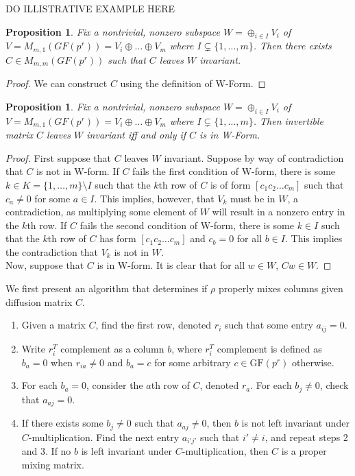 \documentclass[11pt]{amsart}
\newcommand{\GF}{\mathrm{GF}}
\newtheorem{proposition}[theorem]{{\bf Proposition}}
\begin{document}
DO ILLISTRATIVE EXAMPLE HERE

\begin{proposition}
Fix a nontrivial, nonzero subspace $W = \oplus_{i \in I} V_i$ of $V = M_{m,1}(GF(p^r))=V_i \oplus \dots \oplus V_m$ where $I \subsetneq \{1,\dots,m\}$. Then there exists $C \in M_{m,m}(GF(p^r))$ such that $C$ leaves $W$ invariant.
\end{proposition}
\begin{proof}
We can construct $C$ using the definition of W-Form.
\end{proof}

\begin{proposition}
Fix a nontrivial, nonzero subspace $W = \oplus_{i \in I} V_i$ of $V = M_{m,1}(GF(p^r))=V_i \oplus \dots \oplus V_m$ where $I \subsetneq \{1,\dots,m\}$. Then invertible matrix $C$ leaves $W$ invariant iff and only if $C$ is in W-Form.
\end{proposition}
\begin{proof}
First suppose that $C$ leaves $W$ invariant. Suppose by way of contradiction that $C$ is not in W-form. If $C$ fails the first condition of W-form, there is some $k \in K = \{1,\dots,m\} \setminus I$ such that the $k$th row of $C$ is of form $[c_1 c_2 \dots c_m]$ such that $c_a \neq 0$ for some $a \in I$. This implies, however, that $V_k$ must be in $W$, a contradiction, as multiplying some element of $W$ will result in a nonzero entry in the $k$th row. If $C$ fails the second condition of W-form, there is some $k \in I$ such that the $k$th row of $C$ has form $[c_1 c_2 \dots c_m]$ and $c_b = 0$ for all $b \in I$. This implies the contradiction that $V_k$ is not in $W$. \\

Now, suppose that $C$ is in W-form. It is clear that for all $w \in W$, $Cw \in W$.
\end{proof}

We first present an algorithm that determines if $\rho$ properly mixes columns given diffusion matrix $C$.

\begin{enumerate}
    \item Given a matrix $C$, find the first row, denoted $r_i$ such that some entry $a_{ij}=0$.
    \item Write $r_i^T$ complement as a column $b$, where $r_i^T$ complement is defined as $b_a=0$ when $r_{ia} \neq 0$ and $b_a = c$ for some arbitrary $c \in \GF(p^r)$ otherwise.
    \item For each $b_a = 0$, consider the $a$th row of $C$, denoted $r_a$. For each $b_j \neq 0$, check that $a_{aj} = 0$. 
    \item If there exists some $b_j \neq 0$ such that $a_{aj} \neq 0$, then $b$ is not left invariant under $C$-multiplication. Find the next entry $a_{i'j'}$ such that $i' \neq i$, and repeat steps 2 and 3. If no $b$ is left invariant under $C$-multiplication, then $C$ is a proper mixing matrix.
\end{enumerate}
\end{document}
